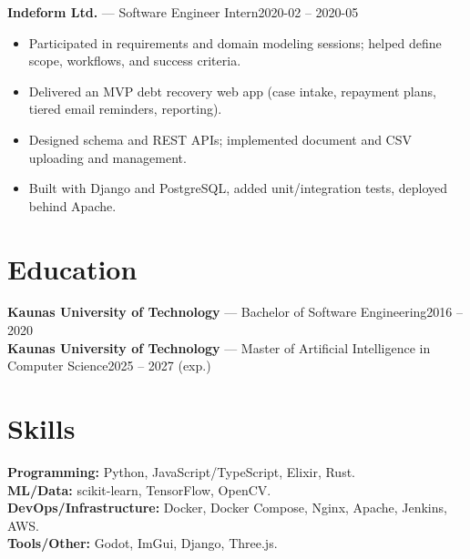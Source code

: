 \documentclass[10pt,a4paper]{article}
\newcommand{\entry}[3]{\noindent\textbf{#1} — #2\hfill #3\\}
\begin{document}
\vspace{0.2em}

\entry{Indeform Ltd.}{Software Engineer Intern}{2020-02 -- 2020-05}
\vspace{-0.8em}
\begin{itemize}[leftmargin=*,itemsep=0.0em,topsep=0.02em]
  \item Participated in requirements and domain modeling sessions; helped define scope, workflows, and success criteria.
  \item Delivered an MVP debt recovery web app (case intake, repayment plans, tiered email reminders, reporting).
  \item Designed schema and REST APIs; implemented document and CSV uploading and management.
  \item Built with Django and PostgreSQL, added unit/integration tests, deployed behind Apache.
\end{itemize}

\section*{Education}
\entry{Kaunas University of Technology}{Bachelor of Software Engineering}{2016 -- 2020}
\entry{Kaunas University of Technology}{Master of Artificial Intelligence in Computer Science}{2025 -- 2027 (exp.)}
\vspace{-0.8em}

\section*{Skills}
\textbf{Programming:} Python, JavaScript/TypeScript, Elixir, Rust.\\
\textbf{ML/Data:} scikit-learn, TensorFlow, OpenCV.\\
\textbf{DevOps/Infrastructure:} Docker, Docker Compose, Nginx, Apache, Jenkins, AWS.\\
\textbf{Tools/Other:} Godot, ImGui, Django, Three.js.
\end{document}
